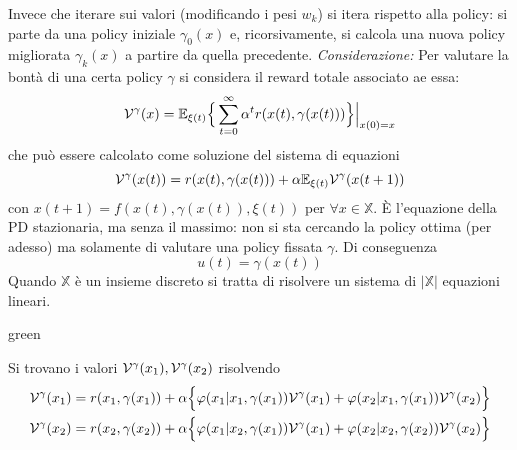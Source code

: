 Invece che iterare sui valori (modificando i pesi $w_k$) si itera rispetto alla policy: si parte da una policy iniziale $\gamma_0(x)$ e, ricorsivamente, si calcola una nuova policy migliorata $\gamma_k(x)$ a partire da quella precedente.
\textit{Considerazione:} Per valutare la bont\`a di una certa policy $\gamma$ si considera il reward totale associato ae essa:
\begin{equation}
\mathcal{V}^\gamma (x) = \mathbb{E}_{\xi(t)} \Big \{ \sum_{t=0}^\infty \alpha^t r(x(t), \gamma(x(t))) \Big \} \Big |_{x(0)=x}
\end{equation} che pu\`o essere calcolato come soluzione del sistema di equazioni
\begin{equation}
\mathcal{V}^\gamma(x(t)) = r(x(t), \gamma(x(t))) + \alpha \mathbb{E}_{\xi(t)} \mathcal{V}^\gamma (x(t+1))
\end{equation} con $x(t+1) = f(x(t), \gamma(x(t)),\xi(t))$ per $\forall x \in \mathbb{X}$.
\`E l'equazione della PD stazionaria, ma senza il massimo: non si sta cercando la policy ottima (per adesso) ma solamente di valutare una policy fissata $\gamma$. Di conseguenza
\begin{equation}
u(t) = \gamma(x(t))
\end{equation}
Quando $\mathbb{X}$ \`e un insieme discreto si tratta di risolvere un sistema di $|\mathbb{X}|$ equazioni lineari.
\begin{mybox}[breakable]{green}{}
\begin{center}
\end{center}
Si trovano i valori $\mathcal{V}^\gamma(x_1), \mathcal{V}^\gamma(x_2)$ risolvendo
\begin{align}
\mathcal{V}^\gamma(x_1) = r(x_1, \gamma(x_1)) + \alpha \Big \{ \varphi(x_1|x_1, \gamma(x_1)) \mathcal{V}^\gamma (x_1) + \varphi(x_2|x_1, \gamma(x_1))\mathcal{V}^\gamma(x_2) \Big \} \\
\mathcal{V}^\gamma(x_2) = r(x_2, \gamma(x_2)) + \alpha \Big \{ \varphi(x_1|x_2, \gamma(x_1)) \mathcal{V}^\gamma (x_1) + \varphi(x_2|x_2, \gamma(x_2))\mathcal{V}^\gamma(x_2) \Big \} 
\end{align}
\end{mybox}
